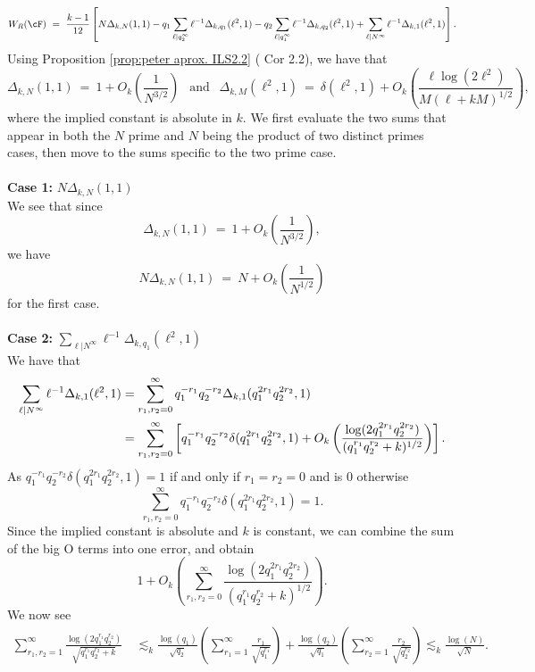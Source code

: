 \documentclass[11pt, reqno]{amsart}
\theoremstyle{definition}
\theoremstyle{remark}
\numberwithin{equation}{section}
\begin{document}
$$W_R(\cF)\ =\ \frac{k-1}{12}\left[N\Delta_{k,N}(1,1)-q_1\sum_{\ell|q_2^{\infty}}\ell^{-1}\Delta_{k,q_1}(\ell^2,1)-q_2\sum_{\ell|q_1^{\infty}}\ell^{-1}\Delta_{k,q_2}(\ell^2,1)+\sum_{\ell|N^{\infty}}\ell^{-1}\Delta_{k,1}(\ell^2,1) \right].$$
Using Proposition \ref{prop:peter aprox. ILS2.2} (\cite{ILS2} Cor 2.2), we have that
$$\Delta_{k,N}(1,1)\ =\ 1+O_k\left( \frac{1}{N^{3/2}} \right) ~~\text{ and } ~~\Delta_{k,M}(\ell^2,1)\ =\ \delta(\ell^2,1)+O_k\left( \frac{\ell\log(2\ell^2)}{M(\ell+kM)^{1/2}} \right),$$ where the implied constant is absolute in $k.$
We first evaluate the two sums that appear in both the $N$ prime and $N$ being the product of two distinct primes cases, then move to the sums specific to the two prime case.\\
\\
\textbf{Case 1:} $N\Delta_{k,N}(1,1)$\\
We see that since $$\Delta_{k,N}(1,1)\ =\ 1+O_k\left( \frac{1}{N^{3/2}} \right),$$
we have $$N\Delta_{k,N}(1,1)\ =\ N+O_k\left(\frac{1}{N^{1/2}}\right)$$
for the first case.\\
\\
\textbf{Case 2:} $\sum_{\ell|N^{\infty}}\ell^{-1}\Delta_{k,q_1}(\ell^2,1)$\\
We have that 
\begin{align}
\sum_{\ell|N^{\infty}}\ell^{-1}\Delta_{k,1}(\ell^2,1) &= \sum_{r_1,r_2=0}^{\infty}q_1^{-r_1}q_2^{-r_2}\Delta_{k,1}(q_1^{2r_1}q_2^{2r_2},1) \notag \\
&=\sum_{r_1,r_2=0}^{\infty}\left[q_1^{-r_1}q_2^{-r_2}\delta(q_1^{2r_1}q_2^{2r_2},1)+O_k\left( \frac{\log(2q_1^{2r_1}q_2^{2r_2})}{(q_1^{r_1}q_2^{r_2}+k)^{1/2}} \right)\right].
\end{align}
As $q_1^{-r_1}q_2^{-r_2}\delta(q_1^{2r_1}q_2^{2r_2},1)=1$ if and only if $r_1=r_2=0$ and is 0 otherwise $$\sum_{r_1,r_2=0}^{\infty}q_1^{-r_1}q_2^{-r_2}\delta(q_1^{2r_1}q_2^{2r_2},1)=1.$$
Since the implied constant is absolute and $k$ is constant, we can combine the sum of the big O terms into one error, and obtain
$$1+O_k \left(\sum_{r_1,r_2=0}^{\infty}  \frac{\log(2q_1^{2r_1}q_2^{2r_2})}{(q_1^{r_1}q_2^{r_2}+k)^{1/2}}\right).$$
We now see
\begin{align*}
     \sum_{r_1,r_2=1}^\infty \frac{\log(2q_1^{r_1}q_2^{r_2})}{\sqrt{q_1^{r_1}q_2^{r_2}+k}} \ &\lesssim_k \frac{\log(q_1)}{\sqrt{q_2}}\left( \sum_{r_1=1}^\infty \frac{r_1}{\sqrt{q_1^{r_1}}}\right)+\frac{\log(q_2)}{\sqrt{q_1}}\left(\sum_{r_2=1}^\infty\frac{r_2}{\sqrt{q_2^{r_2}}}\right)\lesssim_k \frac{\log(N)}{\sqrt{N}}.
\end{align*}
\end{document}
